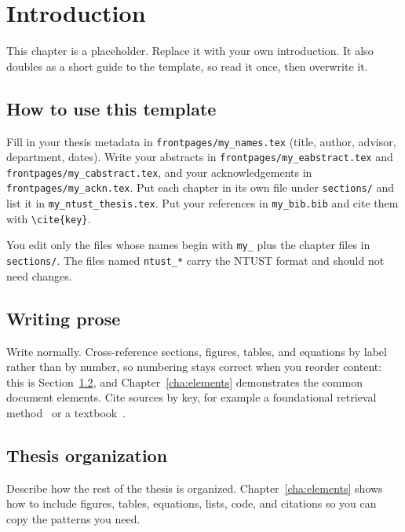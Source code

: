 
\chapter{Introduction}
\label{cha:intro}

This chapter is a placeholder. Replace it with your own introduction. It also
doubles as a short guide to the template, so read it once, then overwrite it.

\section{How to use this template}
\label{sec:how-to-use}

Fill in your thesis metadata in \texttt{frontpages/my\_names.tex} (title, author,
advisor, department, dates). Write your abstracts in
\texttt{frontpages/my\_eabstract.tex} and \texttt{frontpages/my\_cabstract.tex},
and your acknowledgements in \texttt{frontpages/my\_ackn.tex}. Put each chapter in
its own file under \texttt{sections/} and list it in \texttt{my\_ntust\_thesis.tex}.
Put your references in \texttt{my\_bib.bib} and cite them with \verb|\cite{key}|.

You edit only the files whose names begin with \texttt{my\_} plus the chapter
files in \texttt{sections/}. The files named \texttt{ntust\_*} carry the NTUST
format and should not need changes.

\section{Writing prose}
\label{sec:writing}

Write normally. Cross-reference sections, figures, tables, and equations by
label rather than by number, so numbering stays correct when you reorder content:
this is Section~\ref{sec:writing}, and Chapter~\ref{cha:elements} demonstrates the
common document elements. Cite sources by key, for example a foundational
retrieval method~\cite{example-article} or a textbook~\cite{example-book}.

\section{Thesis organization}
\label{sec:org}

Describe how the rest of the thesis is organized. Chapter~\ref{cha:elements}
shows how to include figures, tables, equations, lists, code, and citations so
you can copy the patterns you need.
